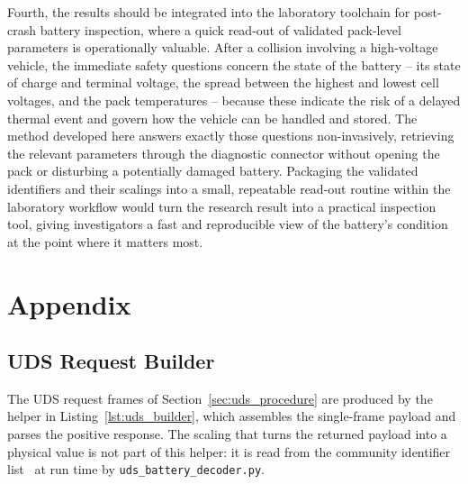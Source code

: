 \documentclass[11pt,a4paper,oneside,parskip=half]{scrreprt}
\begin{document}
Fourth, the results should be integrated into the laboratory toolchain for post-crash battery inspection, where a quick read-out of validated pack-level parameters is operationally valuable. After a collision involving a high-voltage vehicle, the immediate safety questions concern the state of the battery -- its state of charge and terminal voltage, the spread between the highest and lowest cell voltages, and the pack temperatures -- because these indicate the risk of a delayed thermal event and govern how the vehicle can be handled and stored. The method developed here answers exactly those questions non-invasively, retrieving the relevant parameters through the diagnostic connector without opening the pack or disturbing a potentially damaged battery. Packaging the validated identifiers and their scalings into a small, repeatable read-out routine within the laboratory workflow would turn the research result into a practical inspection tool, giving investigators a fast and reproducible view of the battery's condition at the point where it matters most.

\clearpage



\clearpage
\listoftables
{}

\appendix
\chapter{Appendix}
\label{app:code}

\section{UDS Request Builder}
The UDS request frames of Section~\ref{sec:uds_procedure} are produced by the helper in Listing~\ref{lst:uds_builder}, which assembles the single-frame payload and parses the positive response. The scaling that turns the returned payload into a physical value is not part of this helper: it is read from the community identifier list~\cite{vwmebpidlist} at run time by \texttt{uds\_battery\_decoder.py}.
\end{document}
